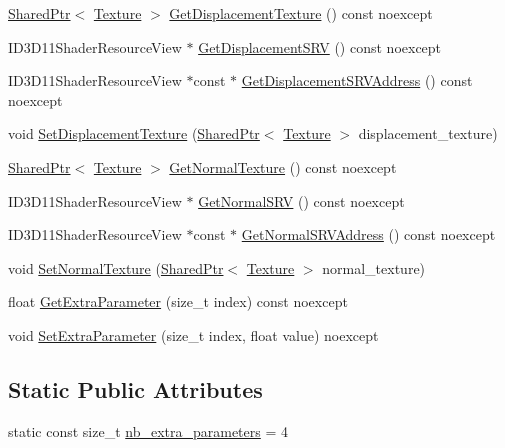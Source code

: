 \begin{DoxyCompactItemize}
\item 
\hyperlink{namespacemage_a1e01ae66713838a7a67d30e44c67703e}{Shared\+Ptr}$<$ \hyperlink{classmage_1_1_texture}{Texture} $>$ \hyperlink{structmage_1_1_material_ab548fbf5844ae7cd2822304ef7fb9602}{Get\+Displacement\+Texture} () const noexcept
\item 
I\+D3\+D11\+Shader\+Resource\+View $\ast$ \hyperlink{structmage_1_1_material_a638ee0913aa0722f499c883b71549503}{Get\+Displacement\+S\+RV} () const noexcept
\item 
I\+D3\+D11\+Shader\+Resource\+View $\ast$const  $\ast$ \hyperlink{structmage_1_1_material_a7672015b558ebbaa52e070f65b052b2e}{Get\+Displacement\+S\+R\+V\+Address} () const noexcept
\item 
void \hyperlink{structmage_1_1_material_ab9c90afa999906a3ad33c8a8da13da24}{Set\+Displacement\+Texture} (\hyperlink{namespacemage_a1e01ae66713838a7a67d30e44c67703e}{Shared\+Ptr}$<$ \hyperlink{classmage_1_1_texture}{Texture} $>$ displacement\+\_\+texture)
\item 
\hyperlink{namespacemage_a1e01ae66713838a7a67d30e44c67703e}{Shared\+Ptr}$<$ \hyperlink{classmage_1_1_texture}{Texture} $>$ \hyperlink{structmage_1_1_material_a7343766b10456e4ed1e09b3fe6110981}{Get\+Normal\+Texture} () const noexcept
\item 
I\+D3\+D11\+Shader\+Resource\+View $\ast$ \hyperlink{structmage_1_1_material_a0be98911c56dedaa4fd2f8714fc8a793}{Get\+Normal\+S\+RV} () const noexcept
\item 
I\+D3\+D11\+Shader\+Resource\+View $\ast$const  $\ast$ \hyperlink{structmage_1_1_material_a297911bb366b1cc1b28d0c35353eb806}{Get\+Normal\+S\+R\+V\+Address} () const noexcept
\item 
void \hyperlink{structmage_1_1_material_a61b695303632bd8fd1399c63e746319e}{Set\+Normal\+Texture} (\hyperlink{namespacemage_a1e01ae66713838a7a67d30e44c67703e}{Shared\+Ptr}$<$ \hyperlink{classmage_1_1_texture}{Texture} $>$ normal\+\_\+texture)
\item 
float \hyperlink{structmage_1_1_material_a1efbefd3f56a7ea01a2a3bfef261f3c0}{Get\+Extra\+Parameter} (size\+\_\+t index) const noexcept
\item 
void \hyperlink{structmage_1_1_material_abc2d6d144f32ca33b2f121b8f5637341}{Set\+Extra\+Parameter} (size\+\_\+t index, float value) noexcept
\end{DoxyCompactItemize}
\subsection*{Static Public Attributes}
\begin{DoxyCompactItemize}
\item 
static const size\+\_\+t \hyperlink{structmage_1_1_material_a91e2bfd0c66c244bbae0faddbee1119f}{nb\+\_\+extra\+\_\+parameters} = 4
\end{DoxyCompactItemize}
